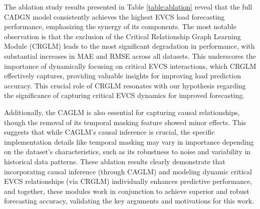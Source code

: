 \documentclass[lettersize,journal]{IEEEtran}
\begin{document}
The ablation study results presented in Table \ref{table:ablation} reveal that the full CADGN model consistently achieves the highest EVCS load forecasting performance, emphasizing the synergy of its components. The most notable observation is that the exclusion of the Critical Relationship Graph Learning Module (CRGLM) leads to the most significant degradation in performance, with substantial increases in MAE and RMSE across all datasets. This underscores the importance of dynamically focusing on critical EVCS interactions, which CRGLM effectively captures, providing valuable insights for improving load prediction accuracy. This crucial role of CRGLM resonates with our hypothesis regarding the significance of capturing critical EVCS dynamics for improved forecasting.

Additionally, the CAGLM is also essential for capturing causal relationships, though the removal of its temporal masking feature showed minor effects. This suggests that while CAGLM's causal inference is crucial, the specific implementation details like temporal masking may vary in importance depending on the dataset's characteristics, such as its robustness to noise and variability in historical data patterns. These ablation results clearly demonstrate that incorporating causal inference (through CAGLM) and modeling dynamic critical EVCS relationships (via CRGLM) individually enhances predictive performance, and together, these modules work in conjunction to achieve superior and robust forecasting accuracy, validating the key arguments and motivations for this work.

\end{document}
